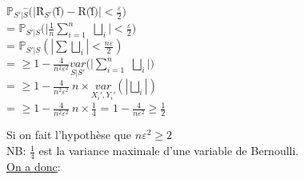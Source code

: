 \documentclass[a4paper]{report}
\begin{document}
\begin{tabbing}
$\mathds{P}_{S'|S}$\=$(|$\^R$_{S'}($\~f$)-$R$($\~f$)|< \frac{\varepsilon}{2})$\\
\> = $\mathds{P}_{S'|S}(|\frac{1}{n}\displaystyle{\sum_{i=1}^{n}}$ $\bigsqcup _{i}|< \frac{\varepsilon}{2})$\\
\> = $\mathds{P}_{S'|S}(|\sum \bigsqcup _{i}|< \frac{n \varepsilon}{2})$\\
\> = $\geq 1 - \frac{4}{n^2 \varepsilon ^2}\underset{S|S'}{var}(|\displaystyle{\sum_{i=1}^{n}}$ $ \bigsqcup _{i}|)$\\
\> = $\geq 1 - \frac{4}{n^2 \varepsilon ^2}\ n\times \underset{X_i', Y_i'}{var}(| \bigsqcup _{i}|)$\\
\> = $\geq 1 - \frac{4}{n^2 \varepsilon ^2}\ n\times \frac{1}{4}$ = $ 1 - \frac{4}{n \varepsilon ^2} \geq \frac{1}{2}$\\
\end{tabbing}
Si on fait l'hypothèse que $n\varepsilon ^2 \geq 2$\\
NB: $\frac{1}{4}$ est la variance maximale d'une variable de Bernoulli.\\
\newline
\underline{On a donc}:\\
\end{document}

